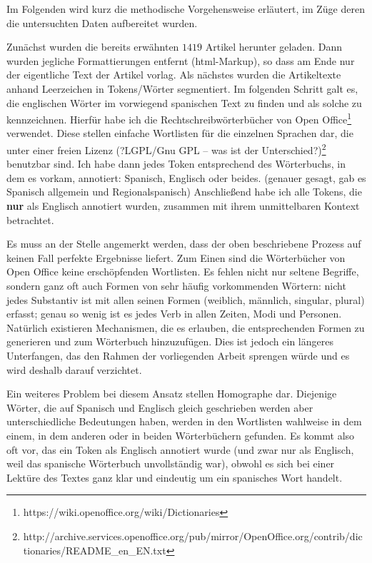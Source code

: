 Im Folgenden wird kurz die methodische Vorgehensweise erläutert, im Züge deren die untersuchten Daten aufbereitet wurden.

Zunächst wurden die bereits erwähnten $1419$ Artikel herunter geladen.
Dann wurden jegliche Formattierungen entfernt (html-Markup), so dass am Ende nur der eigentliche Text der Artikel vorlag.
Als nächstes wurden die Artikeltexte anhand Leerzeichen in Tokens/Wörter segmentiert.
Im folgenden Schritt galt es, die englischen Wörter im vorwiegend spanischen Text zu finden und als solche zu kennzeichnen.
Hierfür habe ich die Rechtschreibwörterbücher von Open Office\footnote{https://wiki.openoffice.org/wiki/Dictionaries} verwendet.
Diese stellen einfache Wortlisten für die einzelnen Sprachen dar, die unter einer freien Lizenz (?LGPL/Gnu GPL -- was ist der Unterschied?)\footnote{http://archive.services.openoffice.org/pub/mirror/OpenOffice.org/contrib/dictionaries/README\_en\_EN.txt} benutzbar sind.
Ich habe dann jedes Token entsprechend des Wörterbuchs, in dem es vorkam, annotiert: Spanisch, Englisch oder beides. (genauer gesagt, gab es Spanisch allgemein und Regionalspanisch)
Anschließend habe ich alle Tokens, die \textbf{nur} als Englisch annotiert wurden, zusammen mit ihrem unmittelbaren Kontext betrachtet.

Es muss an der Stelle angemerkt werden, dass der oben beschriebene Prozess auf keinen Fall perfekte Ergebnisse liefert.
Zum Einen sind die Wörterbücher von Open Office keine erschöpfenden Wortlisten.
Es fehlen nicht nur seltene Begriffe, sondern ganz oft auch Formen von sehr häufig vorkommenden Wörtern:
nicht jedes Substantiv ist mit allen seinen Formen (weiblich, männlich, singular, plural) erfasst;
genau so wenig ist es jedes Verb in allen Zeiten, Modi und Personen.
Natürlich existieren Mechanismen, die es erlauben, die entsprechenden Formen zu generieren und zum Wörterbuch hinzuzufügen.
Dies ist jedoch ein längeres Unterfangen, das den Rahmen der vorliegenden Arbeit sprengen würde und es wird deshalb darauf verzichtet.

Ein weiteres Problem bei diesem Ansatz stellen Homographe dar.
Diejenige Wörter, die auf Spanisch und Englisch gleich geschrieben werden aber unterschiedliche Bedeutungen haben, werden in den Wortlisten wahlweise in dem einem, in dem anderen oder in beiden Wörterbüchern gefunden.
Es kommt also oft vor, das ein Token als Englisch annotiert wurde (und zwar nur als Englisch, weil das spanische Wörterbuch unvollständig war), obwohl es sich bei einer Lektüre des Textes ganz klar und eindeutig um ein spanisches Wort handelt.


